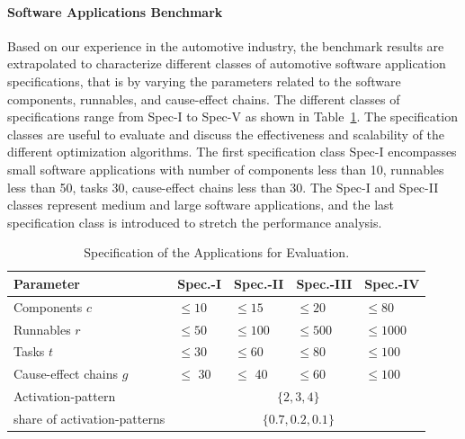 \paragraph{Software Applications Benchmark} Based on our experience in the automotive industry, the benchmark results  are extrapolated to characterize different classes of automotive software application specifications, that is by varying the parameters related to the software components, runnables, and cause-effect chains. The different classes of specifications range from Spec-I to Spec-V as shown in Table~\ref{tbl_app_ranges}. The specification classes are useful to evaluate and discuss the effectiveness and scalability of the different optimization algorithms. The first specification class Spec-I encompasses small software applications with number of components less than 10, runnables less than 50, tasks 30, cause-effect chains less than 30. The Spec-I and Spec-II classes represent medium and large software applications, and the last specification class is introduced to stretch the performance analysis. 
\begin{table}
\centering\small
\begin{tabular}{@{}lllll@{}}
\toprule
Parameter  		& Spec.-I  & Spec.-II & Spec.-III & Spec.-IV\\
\midrule
Components $c$		& $\leq 10$	& $\leq 15$ 	&$\leq 20$ & $\leq 80$\\ 
Runnables $r$		& $\leq 50$	& $\leq 100$ 	& $\leq 500$&$\leq 1000$\\
Tasks $t$ 			& $\leq 30$ & $\leq 60$ 	& $\leq 80$&$\leq 100$\\
Cause-effect chains $g$ & $\leq$ 30 & $\leq$ 40 & $\leq 60$&$\leq100$\\ \midrule
Activation-pattern	& \multicolumn{4}{c}{$\{2,3,4\}$}\\ \midrule
share of activation-patterns	& \multicolumn{4}{c}{$\{0.7, 0.2, 0.1\}$}\\
\bottomrule
\end{tabular}
\caption{Specification of the Applications for Evaluation.}
\label{tbl_app_ranges}
\end{table}

